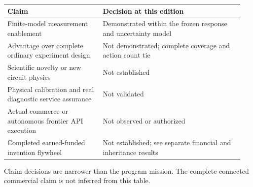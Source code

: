 \documentclass[10pt,letterpaper]{article}
\begin{document}
\begingroup\small\setlength{\tabcolsep}{4pt}\renewcommand{\arraystretch}{1.18}
\begin{longtable}{>{\raggedright\arraybackslash}p{0.38\linewidth}>{\raggedright\arraybackslash}p{0.57\linewidth}}
\toprule \textbf{Claim} & \textbf{Decision at this edition}\\\midrule\endhead
Finite-model measurement enablement & Demonstrated within the frozen response and uncertainty model\\
Advantage over complete ordinary experiment design & Not demonstrated; complete coverage and action count tie\\
Scientific novelty or new circuit physics & Not established\\
Physical calibration and real diagnostic service assurance & Not validated\\
Actual commerce or autonomous frontier API execution & Not observed or authorized\\
Completed earned-funded invention flywheel & Not established; see separate financial and inheritance results\\
\bottomrule\end{longtable}
{\footnotesize Claim decisions are narrower than the program mission. The complete connected commercial claim is not inferred from this table.\par}\endgroup
\end{document}
